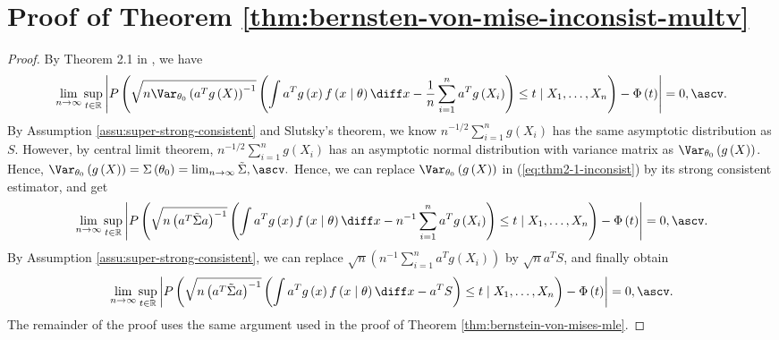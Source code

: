 \section{\label{sec:Proof-of-Theorem-3}Proof of Theorem \ref{thm:bernsten-von-mise-inconsist-multv}}
\begin{proof}
By Theorem 2.1 in \citet{rivoirard2012bernstein}, we have 
\begin{equation}
\lim_{n\rightarrow\infty}\sup_{t\in\mathbb{R}}\left|P\left(\sqrt{n\Var_{\theta_{0}}\left(a^{T}g\left(X\right)\right)^{-1}}\left(\int a^{T}g\left(x\right)f\left(x\mid\theta\right)\diff x-\frac{1}{n}\sum_{i=1}^{n}a^{T}g\left(X_{i}\right)\right)\le t\mid X_{1},\ldots,X_{n}\right)-\Phi\left(t\right)\right|=0,\ascv.\label{eq:thm2-1-inconsist}
\end{equation}
By Assumption \ref{assu:super-strong-consistent} and Slutsky's theorem,
we know $n^{-1/2}\sum_{i=1}^{n}g\left(X_{i}\right)$ has the same
asymptotic distribution as $S$. However, by central limit theorem,
$n^{-1/2}\sum_{i=1}^{n}g\left(X_{i}\right)$ has an asymptotic normal
distribution with variance matrix as $\Var_{\theta_{0}}\left(g\left(X\right)\right)$.
Hence, $\Var_{\theta_{0}}\left(g\left(X\right)\right)=\Sigma\left(\theta_{0}\right)=\lim_{n\rightarrow\infty}\tilde{\Sigma},\ascv.$
Hence, we can replace $\Var_{\theta_{0}}\left(g\left(X\right)\right)$
in (\ref{eq:thm2-1-inconsist}) by its strong consistent estimator,
and get
\[
\lim_{n\rightarrow\infty}\sup_{t\in\mathbb{R}}\left|P\left(\sqrt{n\left(a^{T}\tilde{\Sigma}a\right)^{-1}}\left(\int a^{T}g\left(x\right)f\left(x\mid\theta\right)\diff x-n^{-1}\sum_{i=1}^{n}a^{T}g\left(X_{i}\right)\right)\le t\mid X_{1},\ldots,X_{n}\right)-\Phi\left(t\right)\right|=0,\ascv.
\]
By Assumption \ref{assu:super-strong-consistent}, we can replace
$\sqrt{n}\left(n^{-1}\sum_{i=1}^{n}a^{T}g\left(X_{i}\right)\right)$
by $\sqrt{n}a^{T}S$, and finally obtain
\[
\lim_{n\rightarrow\infty}\sup_{t\in\mathbb{R}}\left|P\left(\sqrt{n\left(a^{T}\tilde{\Sigma}a\right)^{-1}}\left(\int a^{T}g\left(x\right)f\left(x\mid\theta\right)\diff x-a^{T}S\right)\le t\mid X_{1},\ldots,X_{n}\right)-\Phi\left(t\right)\right|=0,\ascv.
\]
The remainder of the proof uses the same argument used in the proof
of Theorem \ref{thm:bernstein-von-mises-mle}. 
\end{proof}

